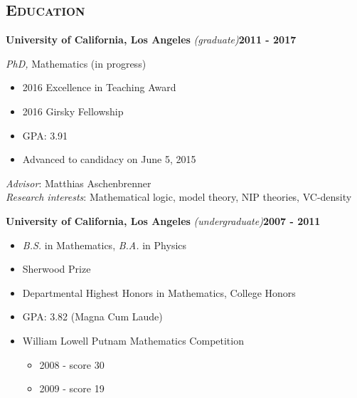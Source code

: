 \documentclass[margin, 10pt]{res} %
\begin{document}
\begin{resume}


\section{\textsc{Education}}

\textbf{University of California, Los Angeles} {\sl (graduate)}\hfill \textbf{2011 - 2017}

{\sl PhD,} Mathematics (in progress)

\begin{itemize}
        \item 2016 Excellence in Teaching Award
        \item 2016 Girsky Fellowship
        \item GPA: 3.91
	\item Advanced to candidacy on June 5, 2015
\end{itemize}

{\sl Advisor}: Matthias Aschenbrenner \\
{\sl Research interests}: Mathematical logic, model theory, NIP theories, VC-density

\textbf{University of California, Los Angeles} {\sl (undergraduate)}\hfill \textbf{2007 - 2011}

\begin{itemize}
	\item {\sl B.S.} in Mathematics, {\sl B.A.} in Physics
	\item Sherwood Prize
	\item Departmental Highest Honors in Mathematics, College Honors
	\item GPA: 3.82 (Magna Cum Laude)
	\item William Lowell Putnam Mathematics Competition
		\begin{itemize}
			\item 2008 - score 30
			\item 2009 - score 19
		\end{itemize}
\end{itemize}

 

\end{resume}
\end{document}
